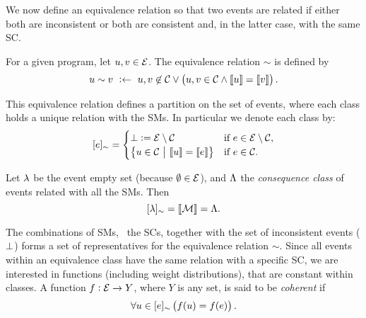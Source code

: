 \documentclass[x11names]{tlp}
\begin{document}
We now define an equivalence relation so that two events are related if either both are inconsistent or both are consistent and, in the latter case, with the same \acl{SC}.
\begin{definition}\label{def:equiv.rel}

	For a given program, let $u, v \in \EVENTSset$.
The equivalence relation
	$\sim$ is defined by
	\begin{equation}
		u \sim v\ :\clause\ u,v \not\in\CONSISTset \vee \del{u,v \in \CONSISTset \wedge \stablecore{u} = \stablecore{v}}.\label{eq:equiv.rel}
	\end{equation}

\end{definition}

This equivalence relation defines a partition on the set of events, where each class holds a unique relation with the \aclp{SM}.
In particular we denote each class by:
\begin{equation}
	\class{e} =
	\begin{cases}
		\inconsistent := \EVENTSset \setminus \CONSISTset
		 & \text{if~} e \in \EVENTSset \setminus \CONSISTset, %
		\\
		\set{u \in \CONSISTset \given \stablecore{u} = \stablecore{e}}
		 & \text{if~} e \in \CONSISTset.
	\end{cases}\label{eq:event.class}
\end{equation}

\begin{proposition}
	\label{prop:consequence.class}
	Let $\lambda$ be the event empty set (because
	$\emptyset \in \EVENTSset$), and $\Lambda$ the
	\emph{consequence class} of events related with all the
	\aclp{SM}.
Then
	\begin{equation}
		\class{\emptyevent} = \stablecore{\MODELset} = \consequenceclass.
	\end{equation}
\end{proposition}

The combinations of \aclp{SM}, \ie~the \aclp{SC}, together with the set of inconsistent events ($\bot$) forms a set of representatives for the equivalence relation $\sim$.
Since all events within an equivalence class have the same relation with a specific \acl{SC}, we are interested in functions (including weight distributions), that are constant within classes.
A function $f:\EVENTSset\to Y$, where $Y$ is any set, is said to be \emph{coherent} if
\begin{equation}
	\forall u\in \class{e} \left( f\at{u} = f\at{e} \right).
\end{equation}
\end{document}
